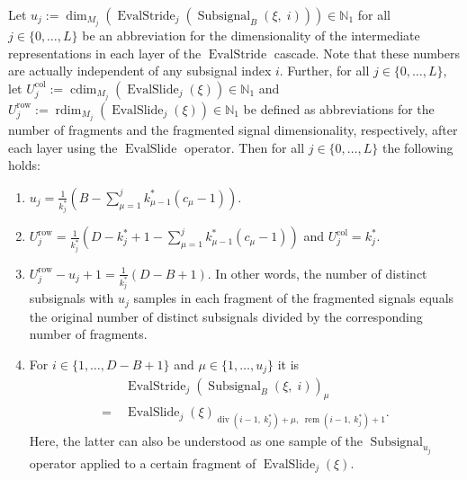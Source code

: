 \documentclass[journal]{IEEEtran}
\newcommand{\N}{\mathbb{N}}
\newcommand{\ROI}{B}
\newcommand{\discint}[2]{\{#1,\dotsc,#2\}}
\newcommand{\inint}[2]{\in\discint{#1}{#2}}
\DeclareMathOperator{\rdim}{rdim}
\DeclareMathOperator{\cdim}{cdim}
\DeclareMathOperator{\Subsignal}{Subsignal}
\DeclareMathOperator{\EvalStride}{EvalStride}
\DeclareMathOperator{\EvalSlide}{EvalSlide}
\renewcommand{\div}[2]{\operatorname{div}(#1,\ #2)}
\newcommand{\rem}[2]{\operatorname{rem}(#1,\ #2)}
\newcommand{\row}{\operatorname{row}}
\newcommand{\col}{\operatorname{col}}
\begin{document}
\begin{lemma}
Let $u_j := \dim_{M_j}(\EvalStride_j(\Subsignal_\ROI(\xi,\; i)))\in\N_1$ for all $j\inint{0}{L}$ be an abbreviation for the dimensionality of the intermediate representations in each layer of the $\EvalStride$ cascade.
Note that these numbers are actually independent of any subsignal index $i$.
Further, for all $j\inint{0}{L}$, let $U_j^{\col} := \cdim_{M_j}(\EvalSlide_j(\xi))\in\N_1$ and $U_j^{\row} := \rdim_{M_j}(\EvalSlide_j(\xi))\in\N_1$ be defined as abbreviations for the number of fragments and the fragmented signal dimensionality, respectively, after each layer using the $\EvalSlide$ operator.
Then for all $j\inint{0}{L}$ the following holds:
\begin{enumerate}\setlength{\itemsep}{.5ex}
  \item \label{lem:processing-chain-a} $u_j = \frac{1}{k_j^*}\left(\ROI - \sum_{\mu = 1}^j k_{\mu - 1}^*(c_\mu - 1)\right)$.
  \item \label{lem:processing-chain-b} $U_j^{\row} = \frac{1}{k_j^*}\left(D - k_j^* + 1 - \sum_{\mu = 1}^j k_{\mu - 1}^*(c_\mu - 1)\right)$ and $U_j^{\col} = k_j^*$.
  \item \label{lem:processing-chain-c} $U_j^{\row} - u_j + 1 = \frac{1}{k_j^*}(D - \ROI + 1)$. In other words, the number of distinct subsignals with $u_j$ samples in each fragment of the fragmented signals equals the original number of distinct subsignals divided by the corresponding number of fragments.
  \item \label{lem:processing-chain-d} For $i\inint{1}{D - \ROI + 1}$ and $\mu\inint{1}{u_j}$ it is
        \begin{align*}
             & \EvalStride_j(\Subsignal_\ROI(\xi,\; i))_\mu\\
          =\ & \EvalSlide_j(\xi)_{\div{i - 1}{k_j^*} + \mu,\;\rem{i - 1}{k_j^*} + 1}\text{.}
        \end{align*}
        Here, the latter can also be understood as one sample of the $\Subsignal_{u_j}$ operator applied to a certain fragment of $\EvalSlide_j(\xi)$.
\end{enumerate}
\end{lemma}
\end{document}
